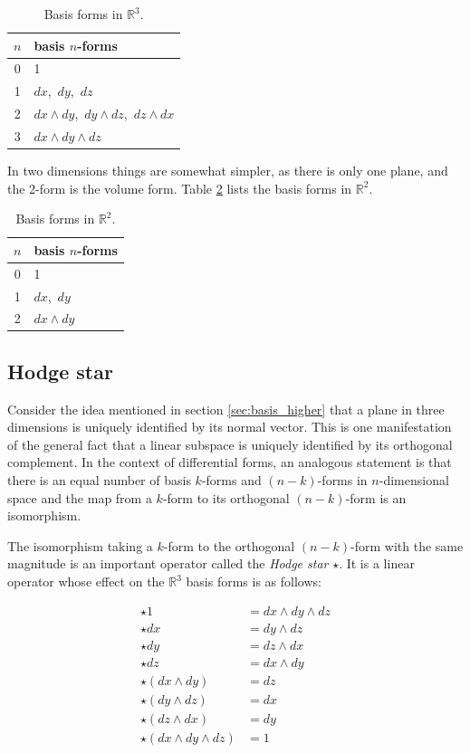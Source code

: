 \documentclass[utf8,english]{gradu3}
\begin{document}
\begin{table}[h]
  \begin{tabular}{c | l}
    $n$ & basis $n$-forms \\
    \hline
    0 & 1 \\
    1 & $dx$,\, $dy$,\, $dz$ \\
    2 & $dx \wedge dy$,\, $dy \wedge dz$,\, $dz \wedge dx$ \\
    3 & $dx \wedge dy \wedge dz$ \\
  \end{tabular}
  \caption{Basis forms in $\mathbb{R}^3$.}
  \label{tab:basis_3d}
\end{table}

In two dimensions things are somewhat simpler,
as there is only one plane, and the 2-form is the volume form.
Table \ref{tab:basis_2d} lists the basis forms in $\mathbb{R}^2$.

\begin{table}[h]
  \begin{tabular}{c | l}
    $n$ & basis $n$-forms \\
    \hline
    0 & 1 \\
    1 & $dx$,\, $dy$ \\
    2 & $dx \wedge dy$ \\
  \end{tabular}
  \caption{Basis forms in $\mathbb{R}^2$.}
  \label{tab:basis_2d}
\end{table}

\subsection{Hodge star}\label{sec:hodge}

Consider the idea mentioned in section \ref{sec:basis_higher}
that a plane in three dimensions is uniquely identified by its normal vector.
This is one manifestation of the general fact that a linear subspace
is uniquely identified by its orthogonal complement.
In the context of differential forms,
an analogous statement is that there is an equal number
of basis $k$-forms and $(n-k)$-forms in $n$-dimensional space
and the map from a $k$-form to its orthogonal $(n-k)$-form
is an isomorphism.

The isomorphism taking a $k$-form to the orthogonal $(n-k)$-form
with the same magnitude is an important operator
called the \textit{Hodge star} $\star$.
It is a linear operator whose effect on the $\mathbb{R}^3$ basis forms
is as follows:

\begin{align*}
  \star 1 &= dx \wedge dy \wedge dz \\
  \star dx &= dy \wedge dz \\
  \star dy &= dz \wedge dx \\
  \star dz &= dx \wedge dy \\
  \star (dx \wedge dy) &= dz \\
  \star (dy \wedge dz) &= dx \\
  \star (dz \wedge dx) &= dy \\
  \star (dx \wedge dy \wedge dz) &= 1 \\
\end{align*}
\end{document}

